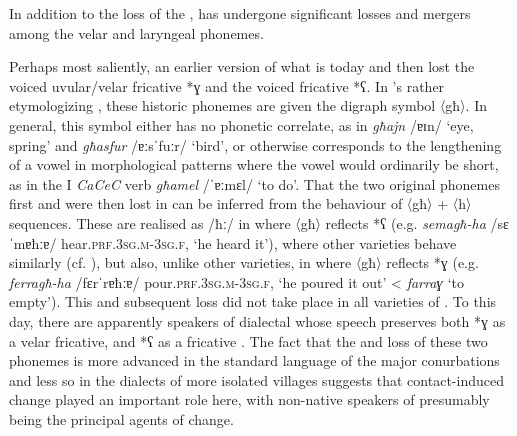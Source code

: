 \documentclass[output=paper]{langsci/langscibook}
\begin{document}
In addition to the loss of the ,  has undergone significant losses and mergers among the velar and laryngeal phonemes.

Perhaps most saliently, an earlier version of what is today    and then lost the voiced uvular/velar fricative *ɣ and the voiced  fricative *ʕ. In 's rather etymologizing , these historic phonemes are given the digraph symbol 〈għ〉. In general, this symbol either has no phonetic correlate, as in \textit{għajn} /ɐɪn/ `eye, spring' and \textit{għasfur} /ɐːsˈfuːr/ `bird', or otherwise corresponds to the lengthening of a vowel in morphological patterns where the vowel would ordinarily be short, as in the  I \textit{CaCeC} verb \textit{għamel} /ˈɐːmɛl/ `to do'. That the two original phonemes first  and were then lost in   can be inferred from the behaviour of 〈għ〉 + 〈h〉 sequences. These are realised as /ħː/ in  where 〈għ〉 reflects *ʕ (e.g. \textit{semagħ-ha} /sɛˈmɐħːɐ/ hear.\textsc{prf.3sg.m-3sg.f}, `he heard it'), where other  varieties behave similarly (cf. \citealt[18] {Woidich2006}), but also, unlike other  varieties, in  where 〈għ〉 reflects *ɣ (e.g. \textit{ferragħ-ha} /fɛrˈrɐħːɐ/ pour.\textsc{prf.3sg.m-3sg.f}, `he poured it out' <  \textit{farraɣ} `to empty'). This  and subsequent loss did not take place in all varieties of . To this day, there are apparently speakers of dialectal  whose speech preserves both *ɣ as a velar fricative, and *ʕ as a  fricative \citep{klimiuk2017}. The fact that the  and loss of these two phonemes is more advanced in the standard language of the major conurbations and less so in the dialects of more isolated villages suggests that contact-induced change played an important role here, with non-native speakers of  presumably being the principal agents of change.
\end{document}
